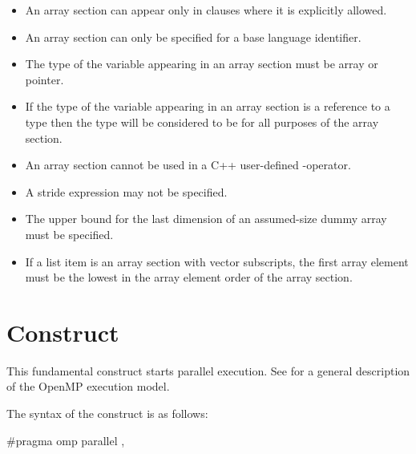 \begin{itemize}
\item An array section can appear only in clauses where it is explicitly allowed.

\ccppspecificstart
\item An array section can only be specified for a base language identifier. 
\ccppspecificend

\cspecificstart
\item The type of the variable appearing in an array section must be array or pointer.
\cspecificend

\cppspecificstart
\item If the type of the variable appearing in an array section is a reference to a type  then the type will be considered to be  for all purposes of the array section.

\item An array section cannot be used in a C++ user-defined \code{[]}-operator.
\cppspecificend

\fortranspecificstart

\item A stride expression may not be specified.

\item The upper bound for the last dimension of an assumed-size dummy
  array must be specified.

\item If a list item is an array section with vector subscripts, the
  first array element must be the lowest in the array element order of
  the array section.

\fortranspecificend


\end{itemize}











\section{ Construct}
\label{sec:parallel Construct}
\summary
This fundamental construct starts parallel execution. See 
for a general description of the OpenMP execution model.

\syntax
\ccppspecificstart
The syntax of the  construct is as follows:
\begin{boxedcode}
\#pragma omp parallel \plc{[clause[ [},\plc{] clause] ... ] new-line}
\end{boxedcode}

